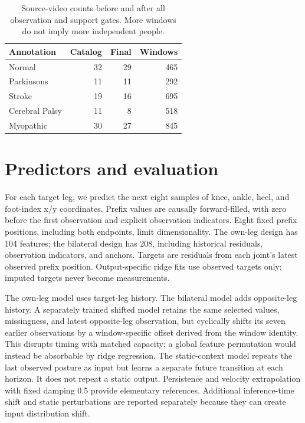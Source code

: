 \documentclass[letterpaper]{article}
\begin{document}
\begin{table}[t]
\centering
\small
\begin{tabular}{lrrr}
\toprule
Annotation & Catalog & Final & Windows \\
\midrule
Normal & 32 & 29 & 465 \\
Parkinsons & 11 & 11 & 292 \\
Stroke & 19 & 16 & 695 \\
Cerebral Palsy & 11 & 8 & 518 \\
Myopathic & 30 & 27 & 845 \\
\bottomrule
\end{tabular}
\caption{Source-video counts before and after all observation and support gates. More windows do not imply more independent people.}
\label{tab:cohort}
\end{table}

\section{Predictors and evaluation}

For each target leg, we predict the next eight samples of knee, ankle, heel, and foot-index x/y coordinates. Prefix values are causally forward-filled, with zero before the first observation and explicit observation indicators. Eight fixed prefix positions, including both endpoints, limit dimensionality. The own-leg design has 104 features; the bilateral design has 208, including historical residuals, observation indicators, and anchors. Targets are residuals from each joint's latest observed prefix position. Output-specific ridge fits use observed targets only; imputed targets never become measurements.

The own-leg model uses target-leg history. The bilateral model adds opposite-leg history. A separately trained shifted model retains the same selected values, missingness, and latest opposite-leg observation, but cyclically shifts its seven earlier observations by a window-specific offset derived from the window identity. This disrupts timing with matched capacity; a global feature permutation would instead be absorbable by ridge regression. The static-context model repeats the last observed posture as input but learns a separate future transition at each horizon. It does not repeat a static output. Persistence and velocity extrapolation with fixed damping 0.5 provide elementary references. Additional inference-time shift and static perturbations are reported separately because they can create input distribution shift.
\end{document}
